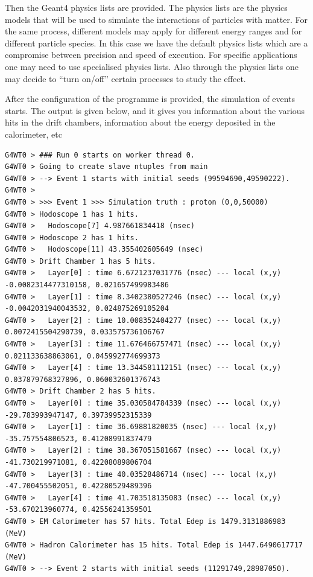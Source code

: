 \documentclass[a4paper,11pt,twoside]{article}
\begin{document}
Then the Geant4 physics lists are provided. The physics lists are the physics models that will be used to simulate the interactions of particles with matter. For the same process, different models may apply for different energy ranges and for different particle species. In this case we have the default physics lists which are a compromise between precision and speed of execution. For specific applications one may need to use specialised physics lists.
Also through the physics lists one may decide to ``turn on/off'' certain processes to study the effect.

After the configuration of the programme is provided, the simulation of events starts. The output is given below, and it gives you information about the various hits in the drift chambers, information about the energy deposited in the calorimeter, etc
\begin{lstlisting}
G4WT0 > ### Run 0 starts on worker thread 0.
G4WT0 > Going to create slave ntuples from main
G4WT0 > --> Event 1 starts with initial seeds (99594690,49590222).
G4WT0 >
G4WT0 > >>> Event 1 >>> Simulation truth : proton (0,0,50000)
G4WT0 > Hodoscope 1 has 1 hits.
G4WT0 >   Hodoscope[7] 4.987661834418 (nsec)
G4WT0 > Hodoscope 2 has 1 hits.
G4WT0 >   Hodoscope[11] 43.355402605649 (nsec)
G4WT0 > Drift Chamber 1 has 5 hits.
G4WT0 >   Layer[0] : time 6.6721237031776 (nsec) --- local (x,y) -0.0082314477310158, 0.021657499983486
G4WT0 >   Layer[1] : time 8.3402380527246 (nsec) --- local (x,y) -0.0042031940043532, 0.024875269105204
G4WT0 >   Layer[2] : time 10.008352404277 (nsec) --- local (x,y) 0.0072415504290739, 0.033575736106767
G4WT0 >   Layer[3] : time 11.676466757471 (nsec) --- local (x,y) 0.021133638863061, 0.045992774699373
G4WT0 >   Layer[4] : time 13.344581112151 (nsec) --- local (x,y) 0.037879768327896, 0.060032601376743
G4WT0 > Drift Chamber 2 has 5 hits.
G4WT0 >   Layer[0] : time 35.030584784339 (nsec) --- local (x,y) -29.783993947147, 0.39739952315339
G4WT0 >   Layer[1] : time 36.69881820035 (nsec) --- local (x,y) -35.757554806523, 0.41208991837479
G4WT0 >   Layer[2] : time 38.367051581667 (nsec) --- local (x,y) -41.730219971081, 0.42208089806704
G4WT0 >   Layer[3] : time 40.03528486714 (nsec) --- local (x,y) -47.700455502051, 0.42280529489396
G4WT0 >   Layer[4] : time 41.703518135083 (nsec) --- local (x,y) -53.670213960774, 0.42556241359501
G4WT0 > EM Calorimeter has 57 hits. Total Edep is 1479.3131886983 (MeV)
G4WT0 > Hadron Calorimeter has 15 hits. Total Edep is 1447.6490617717 (MeV)
G4WT0 > --> Event 2 starts with initial seeds (11291749,28987050).
\end{lstlisting}
\end{document}
